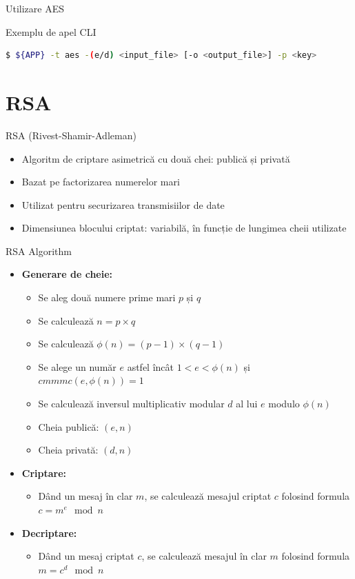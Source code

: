 \documentclass{beamer}
\begin{document}
\begin{frame}[fragile]{Utilizare AES}
  \begin{block}{Exemplu de apel CLI}
    \begin{lstlisting}[language=bash]
$ ${APP} -t aes -(e/d) <input_file> [-o <output_file>] -p <key>
    \end{lstlisting}
  \end{block}
\end{frame}
\section{RSA}

\begin{frame}{RSA (Rivest-Shamir-Adleman)}
  \begin{itemize}
    \item Algoritm de criptare asimetrică cu două chei: publică și privată
    \item Bazat pe factorizarea numerelor mari
    \item Utilizat pentru securizarea transmisiilor de date
    \item Dimensiunea blocului criptat: variabilă, în funcție de lungimea cheii utilizate
  \end{itemize}
\end{frame}

\begin{frame}{RSA Algorithm}
  \begin{itemize}
    \item \textbf{Generare de cheie:}
    \begin{itemize}
      \item Se aleg două numere prime mari $p$ și $q$
      \item Se calculează $n = p \times q$
      \item Se calculează $\phi(n) = (p-1) \times (q-1)$
      \item Se alege un număr $e$ astfel încât $1 < e < \phi(n)$ și $cmmmc(e, \phi(n)) = 1$
      \item Se calculează inversul multiplicativ modular $d$ al lui $e$ modulo $\phi(n)$
      \item Cheia publică: $(e, n)$
      \item Cheia privată: $(d, n)$
    \end{itemize}
    \item \textbf{Criptare:}
    \begin{itemize}
      \item Dând un mesaj în clar $m$, se calculează mesajul criptat $c$ folosind formula $c = m^e \mod n$
    \end{itemize}
    \item \textbf{Decriptare:}
    \begin{itemize}
      \item Dând un mesaj criptat $c$, se calculează mesajul în clar $m$ folosind formula $m = c^d \mod n$
    \end{itemize}
  \end{itemize}
\end{frame}
\end{document}
